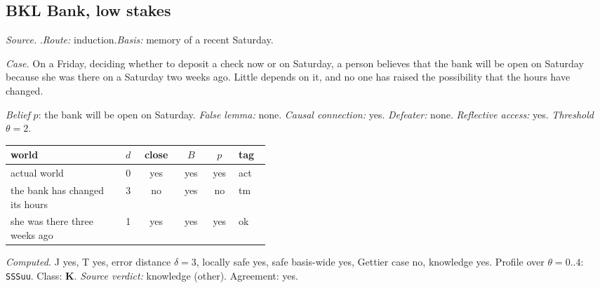 \subsection*{BKL \enspace Bank, low stakes}
\noindent\textit{Source.} \citet{DeRose1992}.\quad \textit{Route:} induction.\quad \textit{Basis:} memory of a recent Saturday.\par
\noindent\textit{Case.} On a Friday, deciding whether to deposit a check now or on Saturday, a person believes that the bank will be open on Saturday because she was there on a Saturday two weeks ago. Little depends on it, and no one has raised the possibility that the hours have changed.\par
\noindent\textit{Belief} $p$: the bank will be open on Saturday.
 \textit{False lemma:} none. \textit{Causal connection:} yes. \textit{Defeater:} none. \textit{Reflective access:} yes. \textit{Threshold} $\theta = 2$.\par
\begin{center}\begin{tabular}{@{}p{0.43\linewidth}rcccl@{}}
world & $d$ & close & $B$ & $p$ & tag \\ \midrule
actual world & 0 & yes & yes & yes & act \\
the bank has changed its hours & 3 & no & yes & no & tm \\
she was there three weeks ago & 1 & yes & yes & yes & ok \\
\end{tabular}\end{center}
\noindent\textit{Computed.} J yes, T yes, error distance $\delta = 3$, locally safe yes, safe basis-wide yes, Gettier case no, knowledge yes. Profile over $\theta = 0..4$: \texttt{SSSuu}. Class: \textbf{K}.
 \textit{Source verdict:} knowledge (other). Agreement: yes.
\par\medskip
{}

